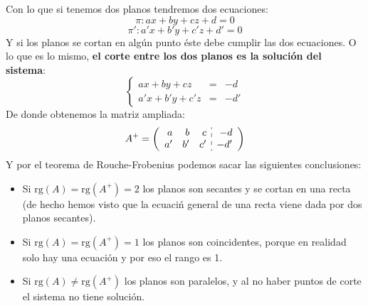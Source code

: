 \documentclass[a4paper,11pt,answers]{exam}
\newcommand\rango[1]{\mathrm{rg}(#1)}
\begin{document}
Con lo que si tenemos dos planos tendremos dos ecuaciones:
\[\pi: ax + by + cz + d = 0\]
\[\pi': a'x + b'y + c'z + d' = 0\]
Y si los planos se cortan en algún punto éste debe cumplir las dos ecuaciones. O lo que es lo mismo, \textbf{el corte entre los dos planos es la solución del sistema}:
\[\left\lbrace\begin{array}{lll}
	ax + by + cz &=& -d\\
	a'x + b'y + c'z &=& -d'
\end{array}\right.\]
De donde obtenemos la matriz ampliada:
\[A^+ = \left(\begin{array}{rrr:r}
	a&b&c&-d\\
	a'&b'&c'&-d'
\end{array}\right)\]
Y por el teorema de Rouche-Frobenius podemos sacar las siguientes conclusiones:
\begin{itemize}
	\item Si $\rango{A} = \rango{A^+} = 2$ los planos son secantes y se cortan en una recta (de hecho hemos visto que la ecuaciń general de una recta viene dada por dos planos secantes).
	\item Si $\rango{A} = \rango{A^+} = 1$ los planos son coincidentes, porque en realidad solo hay una ecuación y por eso el rango es 1.
	\item Si $\rango{A} \neq \rango{A^+}$ los planos son paralelos, y al no haber puntos de corte el sistema no tiene solución.
\end{itemize}
\end{document}
